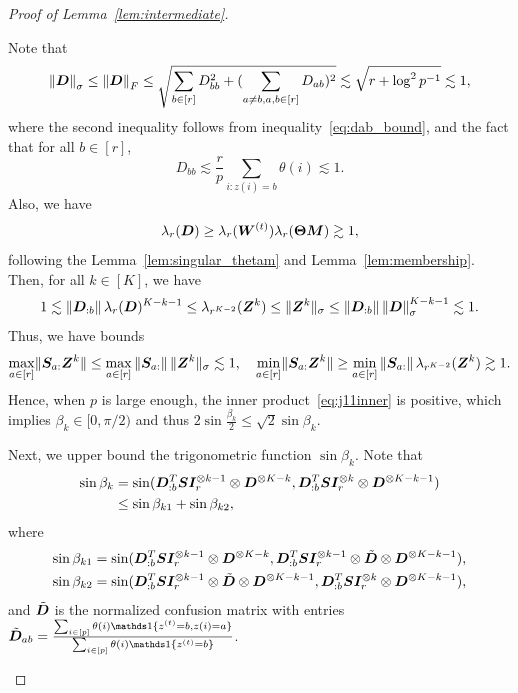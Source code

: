 \documentclass[lettersize,onecolumn,journal]{IEEEtran}
\theoremstyle{definition}
\theoremstyle{definition}
\begin{document}
\begin{proof}[Proof of Lemma~\ref{lem:intermediate}]
\begin{enumerate}[wide]
    Note that 
    \begin{equation}\label{eq:singular_Du}
        \onorm{\mD}_{\sigma} \leq \onorm{\mD}_{F} \leq  \sqrt{\sum_{b \in [r]} D_{bb}^2 + (\sum_{a \neq b, a ,b \in [r]} D_{ab} )^2} \lesssim \sqrt{r  + \log^2 p^{-1}} \lesssim 1,
    \end{equation}
    where the second inequality follows from inequality~\eqref{eq:dab_bound}, and the fact that for all $b \in [r]$,
    \begin{equation}
        D_{bb} \lesssim \frac{r}{p} \sum_{i\colon z(i) = b} \theta(i) \lesssim 1.
    \end{equation}
    Also, we have 
    \begin{equation}\label{eq:singular_Dl}
        \lambda_r(\mD) \geq \lambda_r(\mW^{(t)}) \lambda_r(\mTheta \mM) \gtrsim 1,
    \end{equation}
    following the Lemma~\ref{lem:singular_thetam} and Lemma~\ref{lem:membership}. Then, for all $k \in [K]$, we have 
    \begin{equation}\label{eq:singular_z}
       1 \lesssim \onorm{\mD_{:b}} \lambda_r(\mD)^{K-k-1}  \leq \lambda_{r^{K-2}}(\mZ^{k}) \leq \onormSize{}{\mZ^k}_{\sigma} \leq \onorm{\mD_{:b}} \onorm{\mD}_{\sigma}^{K-k-1} \lesssim 1.
    \end{equation}
    Thus, we have bounds 
    \begin{equation}
         \max_{a \in [r]} \lVert\bm S_{a:} \bm Z^k\rVert \leq \max_{a \in [r]} \left\lVert\bm S_{a:}\right\rVert \lVert\bm Z^k\rVert_{\sigma} \lesssim 1, \quad \min_{a \in [r]} \lVert\bm S_{a:}\bm Z^k\rVert  \geq \min_{a \in [r]} \left\lVert\bm S_{a:}\right\rVert \lambda_{r^{K-2}}(\bm Z^{k}) \gtrsim 1.
    \end{equation}
    Hence, when $p$ is large enough, the inner product~\eqref{eq:j11inner} is positive, which implies $\beta_k \in [0, \pi/2)$ and thus $2 \sin \frac{\beta_k}{2} \leq \sqrt{2} \sin \beta_k$.
    
    Next, we upper bound the trigonometric function $\sin \beta_k$. Note that
    \begin{align}
         \sin \beta_k &= \sin ({\bm{D}_{:b}^{T} \bm S \bm I_r^{\otimes k-1} \otimes \bm{D}^{\otimes K-k} }, {\bm{D}_{:b}^{T} \bm S \bm I_r^{\otimes k} \otimes \bm{D}^{\otimes K-k-1} } )\\
         &\leq \sin \beta_{k1} + \sin \beta_{k2},
    \end{align}
    where
    \begin{align}
         \sin \beta_{k1} &= \sin ({\bm{D}_{:b}^{T} \bm S \bm I_r^{\otimes k-1} \otimes \bm{D}^{\otimes K-k} }, {\bm{D}_{:b}^{T} \bm S \bm I_r^{\otimes k-1} \otimes \tilde {\bm{D}} \otimes \bm{D}^{\otimes K-k-1} } ),\\
         \sin \beta_{k2} & = \sin ({\bm{D}_{:b}^{T} \bm S \bm I_r^{\otimes k-1} \otimes \tilde {\bm{D}} \otimes \bm{D}^{\otimes K-k-1} } , {\bm{D}_{:b}^{T} \bm S \bm I_r^{\otimes k} \otimes \bm{D}^{\otimes K-k-1} }   ),
    \end{align}
    and $\tilde {\bm{D}}$ is the normalized confusion matrix with entries $\tilde \mD_{ab} = \frac{\sum_{i \in [p]} \theta(i) \ind\{z^{(t)} = b, z(i) = a\}}{\sum_{i \in [p] }\theta(i) \ind\{z^{(t)} = b\}}$.
    

\end{enumerate}
\end{proof}
\end{document}
